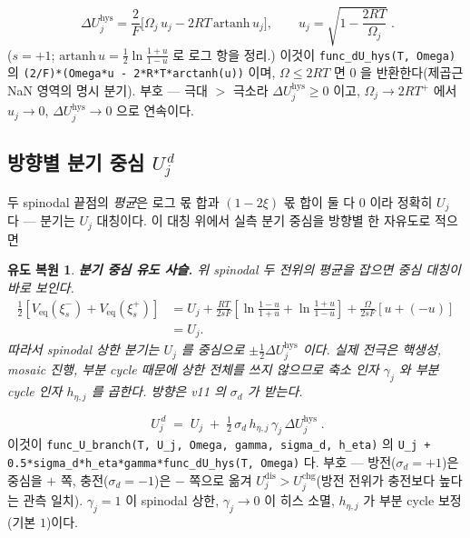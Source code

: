 \documentclass[11pt,a4paper]{article}
\newtheorem*{derivebox}{유도 복원}
\newcommand{\eq}{\mathrm{eq}}
\newcommand{\dis}{\mathrm{dis}}
\newcommand{\chg}{\mathrm{chg}}
\newcommand{\hys}{\mathrm{hys}}
\newcommand{\code}[1]{\texttt{#1}}
\begin{document}
\begin{equation}
\boxed{\;\Delta U_j^\hys
=\frac{2}{F}\Big[\Omega_j\,u_j-2RT\,\mathrm{artanh}\,u_j\Big],
\qquad u_j=\sqrt{1-\frac{2RT}{\Omega_j}}\;.}
\label{eq:dUhys}
\end{equation}
($s=+1$; $\mathrm{artanh}\,u=\tfrac12\ln\tfrac{1+u}{1-u}$ 로 로그 항을 정리.) 이것이 \code{func\_dU\_hys(T, Omega)} 의
\code{(2/F)*(Omega*u - 2*R*T*arctanh(u))} 이며, $\Omega\le2RT$ 면 $0$ 을 반환한다(제곱근 NaN 영역의 명시 분기).
부호 — 극대 $>$ 극소라 $\Delta U_j^\hys\ge0$ 이고, $\Omega_j\to2RT^+$ 에서 $u_j\to0$, $\Delta U_j^\hys\to0$ 으로
연속이다.

\subsection{방향별 분기 중심 $U_j^{\,d}$}
두 spinodal 끝점의 \emph{평균}은 로그 몫 합과 $(1-2\xi)$ 몫 합이 둘 다 $0$ 이라 정확히 $U_j$ 다 — 분기는 $U_j$
대칭이다. 이 대칭 위에서 실측 분기 중심을 방향별 한 자유도로 적으면

\begin{derivebox}
\textbf{분기 중심 유도 사슬.} 위 spinodal 두 전위의 평균을 잡으면 중심 대칭이 바로 보인다.
\begin{align*}
\frac12[V_{\eq}(\xi_s^-)+V_{\eq}(\xi_s^+)]
&=U_j+\frac{RT}{2sF}\left[\ln\frac{1-u}{1+u}+\ln\frac{1+u}{1-u}\right]
+\frac{\Omega}{2sF}[u+(-u)]\\
&=U_j.
\end{align*}
따라서 spinodal 상한 분기는 $U_j$ 를 중심으로 $\pm\tfrac12\Delta U_j^{\hys}$ 이다. 실제 전극은 핵생성, mosaic 진행, 부분 cycle 때문에 상한 전체를 쓰지 않으므로 축소 인자 $\gamma_j$ 와 부분 cycle 인자 $h_{\eta,j}$ 를 곱한다. 방향은 v11 의 $\sigma_d$ 가 받는다.
\end{derivebox}

\begin{equation}
\boxed{\;U_j^{\,d}\;=\;U_j\;+\;\tfrac12\,\sigma_d\,h_{\eta,j}\,\gamma_j\,\Delta U_j^\hys\;.}
\label{eq:Ubranch}
\end{equation}
이것이 \code{func\_U\_branch(T, U\_j, Omega, gamma, sigma\_d, h\_eta)} 의
\code{U\_j + 0.5*sigma\_d*h\_eta*gamma*func\_dU\_hys(T, Omega)} 다. 부호 — 방전($\sigma_d=+1$)은 중심을 $+$ 쪽,
충전($\sigma_d=-1$)은 $-$ 쪽으로 옮겨 $U_j^{\dis}>U_j^{\chg}$(방전 전위가 충전보다 높다는 관측 일치). $\gamma_j=1$ 이
spinodal 상한, $\gamma_j\to0$ 이 히스 소멸, $h_{\eta,j}$ 가 부분 cycle 보정(기본 $1$)이다.
\end{document}
